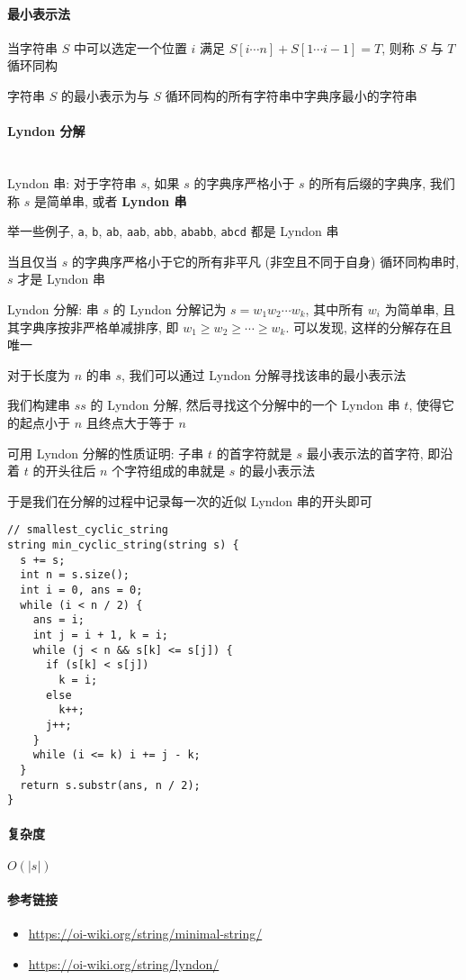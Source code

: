 \paragraph{最小表示法}

当字符串 \(S\) 中可以选定一个位置 \(i\) 满足 \(S[i\cdots n]+S[1\cdots i-1]=T\), 则称 \(S\) 与 \(T\) 循环同构

字符串 \(S\) 的最小表示为与 \(S\) 循环同构的所有字符串中字典序最小的字符串

\paragraph{Lyndon 分解}~\\

Lyndon 串: 对于字符串 \(s\), 如果 \(s\) 的字典序严格小于 \(s\) 的所有后缀的字典序, 我们称 \(s\) 是简单串, 或者 \textbf{Lyndon 串}

举一些例子, \verb|a|, \verb|b|, \verb|ab|, \verb|aab|, \verb|abb|, \verb|ababb|, \verb|abcd| 都是 Lyndon 串

当且仅当 \(s\) 的字典序严格小于它的所有非平凡 (非空且不同于自身) 循环同构串时, \(s\) 才是 Lyndon 串

Lyndon 分解: 串 \(s\) 的 Lyndon 分解记为 \(s=w_1w_2\cdots w_k\), 其中所有 \(w_i\) 为简单串, 且其字典序按非严格单减排序, 即 \(w_1\ge w_2\ge\cdots\ge w_k\). 可以发现, 这样的分解存在且唯一

对于长度为 \(n\) 的串 \(s\), 我们可以通过 Lyndon 分解寻找该串的最小表示法

我们构建串 \(ss\) 的 Lyndon 分解, 然后寻找这个分解中的一个 Lyndon 串 \(t\), 使得它的起点小于 \(n\) 且终点大于等于 \(n\)

可用 Lyndon 分解的性质证明: 子串 \(t\) 的首字符就是 \(s\) 最小表示法的首字符, 即沿着 \(t\) 的开头往后 \(n\) 个字符组成的串就是 \(s\) 的最小表示法

于是我们在分解的过程中记录每一次的近似 Lyndon 串的开头即可

\begin{verbatim}
// smallest_cyclic_string
string min_cyclic_string(string s) {
  s += s;
  int n = s.size();
  int i = 0, ans = 0;
  while (i < n / 2) {
    ans = i;
    int j = i + 1, k = i;
    while (j < n && s[k] <= s[j]) {
      if (s[k] < s[j])
        k = i;
      else
        k++;
      j++;
    }
    while (i <= k) i += j - k;
  }
  return s.substr(ans, n / 2);
}
\end{verbatim}

\paragraph{复杂度}

\(O(|s|)\)

\paragraph{参考链接}

\begin{itemize}
    \item \url{https://oi-wiki.org/string/minimal-string/}
    \item \url{https://oi-wiki.org/string/lyndon/}
\end{itemize}
